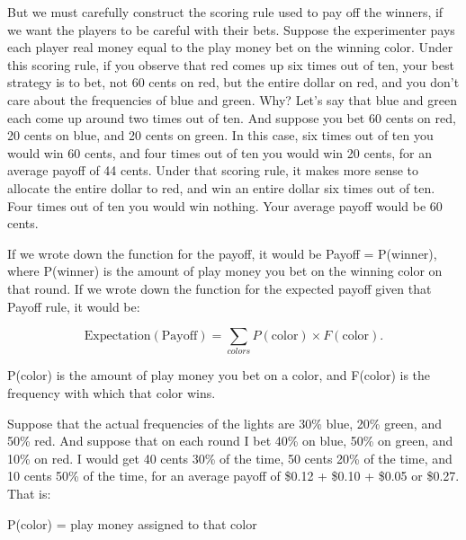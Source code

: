 {
 But we must carefully construct the scoring rule used to pay off
the winners, if we want the players to be careful with their bets.
Suppose the experimenter pays each player real money equal to the play
money bet on the winning color. Under this scoring rule, if you observe
that red comes up six times out of ten, your best strategy is to bet,
not 60 cents on red, but the entire dollar on red, and you
don't care about the frequencies of blue and green.
Why? Let's say that blue and green each come up around
two times out of ten. And suppose you bet 60 cents on red, 20 cents on
blue, and 20 cents on green. In this case, six times out of ten you
would win 60 cents, and four times out of ten you would win 20 cents,
for an average payoff of 44 cents. Under that scoring rule, it makes
more sense to allocate the entire dollar to red, and win an entire
dollar six times out of ten. Four times out of ten you would win
nothing. Your average payoff would be 60 cents.}

{
 If we wrote down the function for the payoff, it would be Payoff =
P(winner), where P(winner) is the amount of play money you bet on the
winning color on that round. If we wrote down the function for the
expected payoff given that Payoff rule, it would be:}

\begin{equation*}
  \text{Expectation}(\text{Payoff}) = \sum_{colors} P(\text{color})\times F(\text{color}).
\end{equation*}



\bigskip

{
 P(color) is the amount of play money you bet on a color, and
F(color) is the frequency with which that color wins.}

{
 Suppose that the actual frequencies of the lights are 30\% blue,
20\% green, and 50\% red. And suppose that on each round I bet 40\% on
blue, 50\% on green, and 10\% on red. I would get 40 cents 30\% of the
time, 50 cents 20\% of the time, and 10 cents 50\% of the time, for an
average payoff of \$0.12 + \$0.10 + \$0.05 or \$0.27. That is:}

{\centering
 P(color) = play money assigned to that color
\par}



